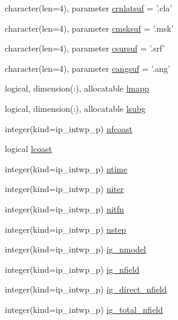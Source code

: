 \begin{DoxyCompactItemize}
\item 
character(len=4), parameter \hyperlink{classmod__oasis__namcouple_acdc7f0d582616ee9e18470aad433ed3a}{crnlatsuf} = '.cla'
\item 
character(len=4), parameter \hyperlink{classmod__oasis__namcouple_aeea3ba680d5ba05a432c12d64c68c8af}{cmsksuf} = '.msk'
\item 
character(len=4), parameter \hyperlink{classmod__oasis__namcouple_adf2c151a84c37bd7cd93867305b4f70b}{csursuf} = '.srf'
\item 
character(len=4), parameter \hyperlink{classmod__oasis__namcouple_a4b921aeee4d921557ab0cd2f0e541dad}{cangsuf} = '.ang'
\item 
logical, dimension(\+:), allocatable \hyperlink{classmod__oasis__namcouple_a8eca7c715a39c523e00ed2be0612950d}{lmapp}
\item 
logical, dimension(\+:), allocatable \hyperlink{classmod__oasis__namcouple_acda1605129987d656360e1ed81e8d199}{lsubg}
\item 
integer(kind=ip\+\_\+intwp\+\_\+p) \hyperlink{classmod__oasis__namcouple_a57f1b6f111a5257a4d6f5a4b18fa6250}{nfcoast}
\item 
logical \hyperlink{classmod__oasis__namcouple_a7657e0f9b495e291f26dc31b4f6145aa}{lcoast}
\item 
integer(kind=ip\+\_\+intwp\+\_\+p) \hyperlink{classmod__oasis__namcouple_a8a962108487c3ca092633bd4292dbfd6}{ntime}
\item 
integer(kind=ip\+\_\+intwp\+\_\+p) \hyperlink{classmod__oasis__namcouple_a6246780a56635119fd8f7935456b06cf}{niter}
\item 
integer(kind=ip\+\_\+intwp\+\_\+p) \hyperlink{classmod__oasis__namcouple_a1e5b5efd046e5ab959fba026bd645945}{nitfn}
\item 
integer(kind=ip\+\_\+intwp\+\_\+p) \hyperlink{classmod__oasis__namcouple_a66c36f23a77081749dc9e7993b0277f3}{nstep}
\item 
integer(kind=ip\+\_\+intwp\+\_\+p) \hyperlink{classmod__oasis__namcouple_ac66a16e4153939c774a0b9a2854e6663}{ig\+\_\+nmodel}
\item 
integer(kind=ip\+\_\+intwp\+\_\+p) \hyperlink{classmod__oasis__namcouple_a674f201daa7f2e1ba4c71221bda91d9c}{ig\+\_\+nfield}
\item 
integer(kind=ip\+\_\+intwp\+\_\+p) \hyperlink{classmod__oasis__namcouple_a531825c07a164f6139e5eebd59e295a2}{ig\+\_\+direct\+\_\+nfield}
\item 
integer(kind=ip\+\_\+intwp\+\_\+p) \hyperlink{classmod__oasis__namcouple_a3de3e6eb2bf1e81d77e9c117b7d5985f}{ig\+\_\+total\+\_\+nfield}

\end{DoxyCompactItemize}
